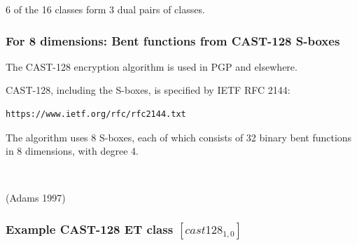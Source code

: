 \documentclass[pdf,sprung,slideColor,nocolorBG]{beamer}
\newenvironment{colortheme}[1]{
\def\ProvidesPackageRCS $##1${\relax}
\renewcommand{\ProcessOptions}{\relax}
\makeatletter

\makeatother
}{}
\newcommand{\slidecite}[1]{\tiny{(#1)}\normalsize{}}
\begin{document}
\begin{colortheme}{jubata}
\begin{frame}
\begin{figure}
\begin{minipage}{.48\textwidth}
  \label{fig:psf_9_5439_dual_cayley_graph_index_matrix}
\end{minipage}%
\end{figure}
6 of the 16 classes form 3 dual pairs of classes.
\end{frame}
\begin{colortheme}{seagull}
\begin{frame}[fragile]
\frametitle{For 8 dimensions: Bent functions from CAST-128 S-boxes}

The CAST-128 encryption algorithm is used in PGP and elsewhere.

CAST-128, including the S-boxes, is specified by IETF RFC 2144:
\begin{verbatim}
https://www.ietf.org/rfc/rfc2144.txt
\end{verbatim}

The algorithm uses 8 S-boxes, each of which consists of 32 binary bent functions in 8 dimensions,
with degree 4.

~

\slidecite{Adams 1997}
\end{frame}
\end{colortheme}
\begin{frame}
\frametitle{Example CAST-128 ET class $[cast128_{1,0}]$}
\begin{figure}
\centering
\begin{minipage}{.48\textwidth}
  \centering


\end{minipage}
\end{figure}
\end{frame}
\end{colortheme}
\end{document}
